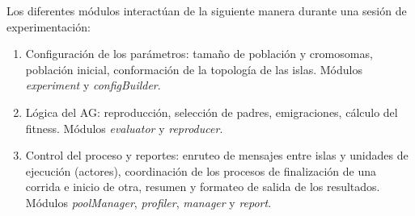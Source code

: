 \noindent Los diferentes módulos interactúan de la siguiente manera durante una sesión de experimentación:

\begin{enumerate}

  \item Configuración de los parámetros: tamaño de población y cromosomas, población inicial, conformación de la topología de las islas. Módulos {\em experiment} y {\em configBuilder}.

  \item Lógica del AG: reproducción, selección de padres, emigraciones, cálculo del fitness. Módulos {\em evaluator} y {\em reproducer}.

  \item Control del proceso y reportes: enruteo de mensajes entre islas y unidades de ejecución (actores), coordinación de los procesos de finalización de una corrida e inicio de otra, resumen y formateo de salida de los resultados. Módulos {\em poolManager}, {\em profiler}, {\em manager} y {\em report}.

\end{enumerate}
